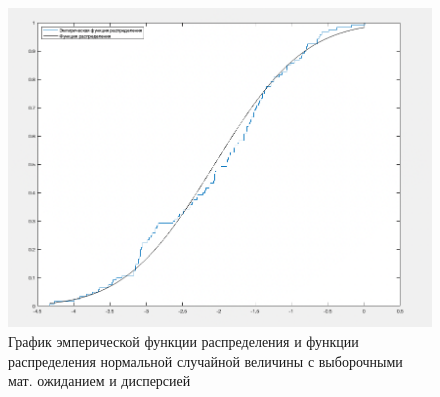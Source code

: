 \documentclass[12pt]{report}
\begin{document}
\begin{figure}[H]
	\centering
	\includegraphics[scale=0.6]{img/2.png}
	\caption{График эмперической функции распределения и функции распределения нормальной случайной величины с выборочными мат. ожиданием и дисперсией}
	\label{fig:2}
\end{figure}

	
\end{document}

